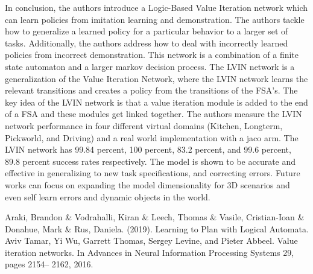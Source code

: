 \documentclass[letterpaper, 10 pt, conference]{ieeeconf}  %
\begin{document}
In conclusion, the authors introduce a Logic-Based Value Iteration network which can learn policies from imitation learning and demonstration. The authors tackle how to generalize a learned policy for a particular behavior to a larger set of tasks. Additionally, the authors address how to deal with incorrectly learned policies from incorrect demonstration. This network is a combination of a finite state automaton and a larger markov decision process. The LVIN network is a generalization of the Value Iteration Network, where the LVIN network learns the relevant transitions and creates a policy from the transitions of the FSA's. The key idea of the LVIN network is that a value iteration module is added to the end of a FSA and these modules get linked together. 
\newline
\indent The authors measure the LVIN network performance in four different virtual domains (Kitchen, Longterm, Pickworld, and Driving) and a real world implementation with a jaco arm. The LVIN network has 99.84 percent, 100 percent, 83.2 percent, and 99.6 percent, 89.8 percent success rates respectively. The model is shown to be accurate and effective in generalizing to new task specifications, and correcting errors. Future works can focus on expanding the model dimensionality for 3D scenarios and even self learn errors and dynamic objects in the world.

\addtolength{\textheight}{-12cm}   %








\begin{thebibliography}{99}

 Araki, Brandon \& Vodrahalli, Kiran \& Leech, Thomas \& Vasile, Cristian-Ioan \& Donahue, Mark \& Rus, Daniela. (2019). Learning to Plan with Logical Automata.
 Aviv Tamar, Yi Wu, Garrett Thomas, Sergey Levine, and Pieter Abbeel. Value iteration networks. In Advances in Neural Information Processing Systems 29, pages 2154– 2162, 2016.


\end{thebibliography}
\end{document}
